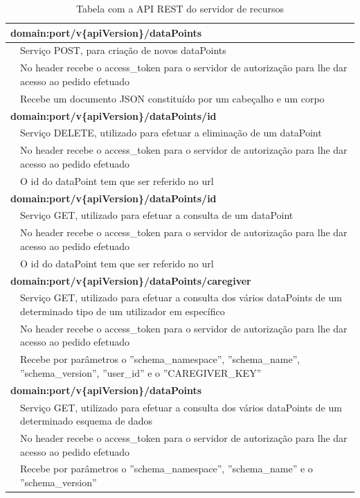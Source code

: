\begin{table}[H]
\label{t:apirest-data}
\centering
\begin{tabularx}{1\textwidth}{|p{0.3cm} p{14.4cm}|}
\multicolumn{2}{l}{\textbf{domain:port/v\{apiVersion\}/dataPoints}}  \\ \hline 
 & Serviço POST, para criação de novos dataPoints \\
 & No header recebe o access\_token para o servidor de autorização para lhe dar acesso ao pedido efetuado \\
 & Recebe um documento JSON constituído por um cabeçalho e um corpo \\ \hline
\multicolumn{2}{l}{\textbf{domain:port/v\{apiVersion\}/dataPoints/id}} \\ \hline
 & Serviço DELETE, utilizado para efetuar a eliminação de um dataPoint \\
 & No header recebe o access\_token para o servidor de autorização para lhe dar acesso ao pedido efetuado \\
 & O id do dataPoint tem que ser referido no url \\ \hline
 \multicolumn{2}{l}{\textbf{domain:port/v\{apiVersion\}/dataPoints/id}} \\ \hline
 & Serviço GET, utilizado para efetuar a consulta de um dataPoint \\
 & No header recebe o access\_token para o servidor de autorização para lhe dar acesso ao pedido efetuado \\
 & O id do dataPoint tem que ser referido no url \\ \hline
 \multicolumn{2}{l}{\textbf{domain:port/v\{apiVersion\}/dataPoints/caregiver}} \\ \hline
 & Serviço GET, utilizado para efetuar a consulta dos vários dataPoints de um determinado tipo de um utilizador em específico \\
 & No header recebe o access\_token para o servidor de autorização para lhe dar acesso ao pedido efetuado \\
 & Recebe por parâmetros o ''schema\_namespace'', ''schema\_name'', ''schema\_version'', ''user\_id'' e o ''CAREGIVER\_KEY'' \\ \hline
 \multicolumn{2}{l}{\textbf{domain:port/v\{apiVersion\}/dataPoints}} \\ \hline
 & Serviço GET, utilizado para efetuar a consulta dos vários dataPoints de um determinado esquema de dados \\
 & No header recebe o access\_token para o servidor de autorização para lhe dar acesso ao pedido efetuado \\
 & Recebe por parâmetros o ''schema\_namespace'', ''schema\_name'' e o ''schema\_version'' \\ \hline
\end{tabularx}
\caption{Tabela com a API REST do servidor de recursos}
\end{table}


